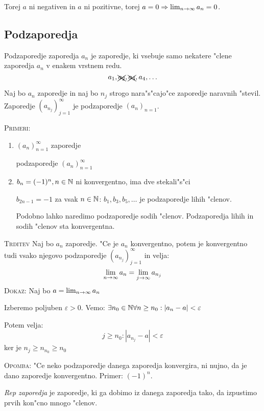 Torej $a$ ni negativen in $a$ ni pozitivne, torej $a = 0 \Rightarrow \lim_{n \rightarrow \infty} a_n = 0$.

\subsection{Podzaporedja}
Podzaporedje zaporedja $a_n$ je zaporedje, ki vsebuje samo nekatere "clene zaporedja $a_n$ v enakem vrstnem redu.
\begin{equation*}
a_1, \xcancel{a_2}, \xcancel{a_3}, a_4, \ldots
\end{equation*}

 Naj bo $a_n$ zaporedje in naj bo $n_j$ strogo nara"s"cajo"ce zaporedje naravnih "stevil. Zaporedje $(a_{n_j})_{j=1}^\infty$ je podzaporedje $(a_n)_{n=1}$.

\textsc{Primeri:}
\begin{enumerate}[1)]
	\item $(a_n)_{n=1}^\infty$ zaporedje
	
	podzaporedje $(a_n)_{n=1}^\infty$
	
	\item $b_n = (-1)^n, n \in \mathbb{N}$ ni konvergentno, ima dve stekali"s"ci
	
	$b_{2n-1} = -1$ za vsak $n \in \mathbb{N}$: $b_1, b_3, b_5, \ldots$ je podzaporedje lihih "clenov.
	
	Podobno lahko naredimo podzaporedje sodih "clenov. Podzaporedja lihih in sodih "clenov sta konvergentna.
\end{enumerate}

\textsc{Trditev} Naj bo $a_n$ zaporedje. "Ce je $a_n$ konvergentno, potem je konvergentno tudi vsako njegovo podzaporedje $(a_{n_j})_{j=1}^\infty$ in velja:
\begin{equation*}
\lim_{n \rightarrow \infty}a_n = \lim_{j \rightarrow \infty} a_{n_j}
\end{equation*}
\textsc{Dokaz:} Naj bo $a = \lim_{n \rightarrow \infty}a_n$

Izberemo poljuben $\varepsilon > 0$. Vemo: $\exists n_0 \in \mathbb{N} \forall n \geq n_0: |a_n - a| < \varepsilon$

Potem velja:
\begin{equation*}
j \geq n_0: |a_{n_j} - a| < \varepsilon
\end{equation*}
ker je $n_j \geq n_{n_0} \geq n_0$

\textsc{Opomba:} "Ce neko podzaporedje danega zaporedja konvergira, ni nujno, da je dano zaporedje konvergentno. Primer: $(-1)^n$.

 \emph{Rep zaporedja} je zaporedje, ki ga dobimo iz danega zaporedja tako, da izpustimo prvih kon"cno mnogo "clenov.


